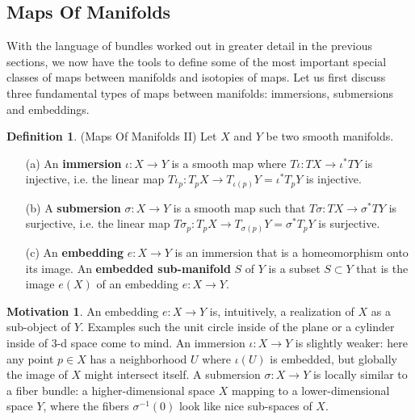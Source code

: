 \documentclass[12pt]{article}
\theoremstyle{definition}
\newtheorem{definition}[theorem]{Definition}
\newtheorem{motivation}[theorem]{Motivation}
\numberwithin{equation}{section}
\begin{document}
\subsection{Maps Of Manifolds} \label{subsec:maps_of_manifolds}

With the language of bundles worked out in greater detail in the previous sections, we now have the tools to define some of the most important special classes of maps between manifolds and isotopies of maps. Let us first discuss three fundamental types of maps between manifolds: immersions, submersions and embeddings. 

\begin{definition} \label{def:maps_of_manifolds_2} (Maps Of Manifolds II) Let $X$ and $Y$ be two smooth manifolds.

\begin{itemize}
	\item[(a)] An {\bf immersion} $\iota:X \to Y$ is a smooth map where $T\iota:TX \to \iota^*TY$ is injective, i.e. the linear map $T\iota_p:T_pX \to T_{\iota(p)}Y = \iota^*T_pY$ is injective.
	\item[(b)] A {\bf submersion} $\sigma:X \to Y$ is a smooth map such that $T\sigma:TX \to \sigma^*TY$ is surjective, i.e. the linear map $T\sigma_p:T_pX \to T_{\sigma(p)}Y = \sigma^*T_pY$ is surjective.
	\item[(c)] An {\bf embedding} $e:X \to Y$ is an immersion that is a homeomorphism onto its image. An {\bf embedded sub-manifold} $S$ of $Y$ is a subset $S \subset Y$ that is the image $e(X)$ of an embedding $e:X \to Y$.
\end{itemize}

\end{definition}

\begin{motivation} An embedding $e:X \to Y$ is, intuitively, a realization of $X$ as a sub-object of $Y$. Examples such the unit circle inside of the plane or a cylinder inside of $3$-d space come to mind. An immersion $\iota:X \to Y$ is slightly weaker: here any point $p \in X$ has a neighborhood $U$ where $\iota(U)$ is embedded, but globally the image of $X$ might intersect itself. A submersion $\sigma:X \to Y$ is locally similar to a fiber bundle: a higher-dimensional space $X$ mapping to a lower-dimensional space $Y$, where the fibers $\sigma^{-1}(0)$ look like nice sub-spaces of $X$. 
\end{motivation}
\end{document}
